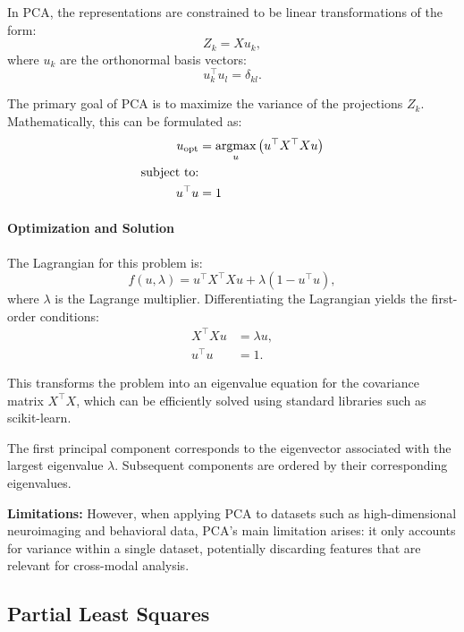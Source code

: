 In PCA, the representations are constrained to be linear transformations of the form:
\begin{equation}\label{eq:pca-linear-function-def}
    Z_k = X u_k,
\end{equation}
where $u_k$ are the orthonormal basis vectors:
\begin{equation}\label{eq:pca-orthonormality-constraint}
    u_k^\top u_l = \delta_{kl}.
\end{equation}

The primary goal of PCA is to maximize the variance of the projections \(Z_k\). Mathematically, this can be formulated
as:
\begin{align}
    u_{\text{opt}} &= \underset{u}{\text{argmax}} \left( u^\top X^\top Xu \right) \\
    \text{subject to:} \notag \\
    u^\top u &= 1 \notag
\end{align}

\paragraph{Optimization and Solution}
The Lagrangian for this problem is:
\begin{equation}
    f(u,\lambda) = u^\top X^\top Xu + \lambda(1 - u^\top u),
\end{equation}
where \(\lambda\) is the Lagrange multiplier. Differentiating the Lagrangian yields the first-order conditions:
\begin{align}
    X^\top X u &= \lambda u, \\
    u^\top u &= 1.
\end{align}

This transforms the problem into an eigenvalue equation for the covariance matrix \(X^\top X\), which can be efficiently solved using standard libraries such as scikit-learn\cite{pedregosa2011scikit}.

The first principal component corresponds to the eigenvector associated with the largest eigenvalue \(\lambda\). Subsequent components are ordered by their corresponding eigenvalues.

\textbf{Limitations: }However, when applying PCA to datasets such as high-dimensional neuroimaging and behavioral
data, PCA's main limitation arises: it only accounts for variance within a single dataset, potentially discarding features that are relevant for cross-modal analysis.

\subsection{Partial Least Squares}


